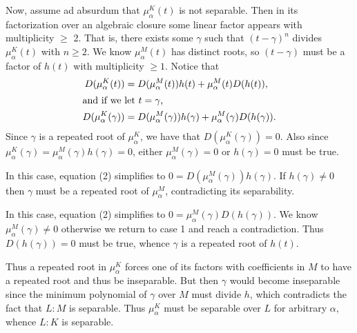 \documentclass{article}
\begin{document}
\begin{solution}
  Now, assume ad absurdum that $\mu_{\alpha}^{K}(t)$ is not separable.
  Then in its factorization over an algebraic closure some linear factor appears with multiplicity $ \geq $ 2.
  That is, there exists some $\gamma$ such that $(t-\gamma)^n$ divides $\mu_{\alpha}^{K}(t)$ with $ n\geq 2 $.
  We know $ \mu_{\alpha}^{M}(t) $ has distinct roots, so $ (t-\gamma) $ must be a factor of $ h(t) $ with multiplicity $ \geq 1 $.
  Notice that \begin{align}
    D(\mu_\alpha^K(t)) &= D(\mu_{\alpha}^{M}(t)) h(t)+\mu_{\alpha}^{M}(t) D(h(t)), \\
    \intertext{and if we let $ t=\gamma $,}
    D(\mu_\alpha^K(\gamma)) &= D(\mu_{\alpha}^{M}(\gamma)) h(\gamma)+\mu_{\alpha}^{M}(\gamma) D(h(\gamma)).
  \end{align}
  Since $ \gamma $ is a repeated root of $ \mu_\alpha^K $, we have that $ D(\mu_\alpha^K(\gamma))=0 $.
  Also since $ \mu_\alpha^K(\gamma) = \mu_{\alpha}^{M}(\gamma) h(\gamma) = 0 $, either $ \mu_{\alpha}^{M}(\gamma) = 0 $ or $ h(\gamma) = 0 $ must be true.
  \begin{subproof}[Case 1 ($ \mu_{\alpha}^{M}(\gamma) = 0 $).]
    In this case, equation (2) simplifies to $ 0 = D(\mu_{\alpha}^{M}(\gamma)) h(\gamma) $.
    If $ h(\gamma) \neq 0 $ then $ \gamma $ must be a repeated root of $ \mu_\alpha^M $, contradicting its separability.
  \end{subproof}
  \begin{subproof}[Case 2 ($ h(\gamma) = 0 $).]
    In this case, equation (2) simplifies to $ 0 = \mu_{\alpha}^{M}(\gamma) D(h(\gamma)) $.
    We know $\mu_{\alpha}^{M}(\gamma) \neq 0$ otherwise we return to case 1 and reach a contradiction.
    Thus $ D(h(\gamma)) = 0 $ must be true, whence $ \gamma $ is a repeated root of $ h(t) $.
  \end{subproof}
  Thus a repeated root in $ \mu_\alpha^K $ forces one of its factors with coefficients in $ M $ to have a repeated root and thus be inseparable.
  But then $ \gamma $ would become inseparable since the minimum polynomial of $ \gamma $ over $ M $ must divide $ h $, which contradicts the fact that $ L:M $ is separable.
  Thus $ \mu_\alpha^K $ must be separable over $ L $ for arbitrary $ \alpha $, whence $ L:K $ is separable.
\end{solution}
\end{document}
